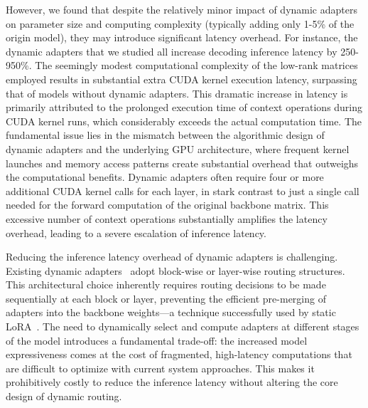 However, we found that despite the relatively minor impact of dynamic adapters on parameter size and computing complexity (typically adding only 1-5\% of the origin model), they may introduce significant latency overhead. 
For instance, the dynamic adapters that we studied all increase decoding inference latency by 250-950\%. 
The seemingly modest computational complexity of the low-rank matrices employed results in substantial extra CUDA kernel execution latency, surpassing that of models without dynamic adapters. 
This dramatic increase in latency is primarily attributed to the prolonged execution time of context operations during CUDA kernel runs, which considerably exceeds the actual computation time. 
The fundamental issue lies in the mismatch between the algorithmic design of dynamic adapters and the underlying GPU architecture, where frequent kernel launches and memory access patterns create substantial overhead that outweighs the computational benefits.
Dynamic adapters often require four or more additional CUDA kernel calls for each layer, in stark contrast to just a single call needed for the forward computation of the original backbone matrix. 
This excessive number of context operations substantially amplifies the latency overhead, leading to a severe escalation of inference latency.



Reducing the inference latency overhead of dynamic adapters is challenging. Existing dynamic adapters~\cite{dou2024loramoe,feng2024mixtureofloras,gao2024higher,gou2024mixture,li2024mixlora,liu2023moelora,luo2024moelora,wu2024parameterefficient,yang2024moral} adopt block-wise or layer-wise routing structures. This architectural choice inherently requires routing decisions to be made sequentially at each block or layer, preventing the efficient pre-merging of adapters into the backbone weights—a technique successfully used by static LoRA~\cite{Hu2021LoRALA}. The need to dynamically select and compute adapters at different stages of the model introduces a fundamental trade-off: the increased model expressiveness comes at the cost of fragmented, high-latency computations that are difficult to optimize with current system approaches. This makes it prohibitively costly to reduce the inference latency without altering the core design of dynamic routing.

